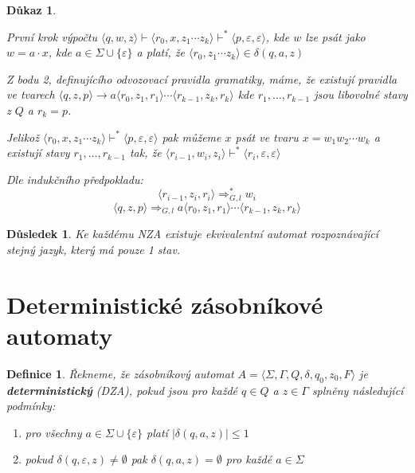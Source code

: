 \documentclass[10pt, a4paper, titlepage]{article}
\theoremstyle{note}
\newtheorem{definice}{Definice}
\newtheorem{dukaz}{Důkaz}
\newtheorem{dusledek}{Důsledek}
\begin{document}
\begin{dukaz}
\begin{itemize}
První krok výpočtu $\langle q,w,z \rangle \vdash \langle r_0,x,z_1 \cdots z_k \rangle \vdash^* \langle p,\varepsilon,\varepsilon \rangle$, kde $w$ lze psát jako $w=a\cdot x$, kde $a \in \Sigma \cup \lbrace \varepsilon \rbrace$ a platí, že $\langle r_0,z_1 \cdots z_k \rangle \in \delta (q,a,z)$

Z bodu 2, definujícího odvozovací pravidla gramatiky, máme, že existují pravidla ve tvarech $\langle q,z,p \rangle \rightarrow a \langle r_0,z_1,r_1 \rangle \cdots \langle r_{k-1},z_k,r_k \rangle$ kde $r_1,\ldots,r_{k-1}$ jsou libovolné stavy z $Q$ a $r_k=p$.

Jelikož $\langle r_0,x,z_1\cdots z_k \rangle \vdash^* \langle p,\varepsilon,\varepsilon \rangle$ pak můžeme $x$ psát ve tvaru $x=w_1w_2\cdots w_k$ a existují stavy $r_1,\ldots,r_{k-1}$ tak, že $\langle r_{i-1},w_i,z_i \rangle \vdash^* \langle r_i,\varepsilon,\varepsilon \rangle$

Dle indukčního předpokladu:
$$
\langle r_{i-1},z_i,r_i \rangle \Rightarrow_{G,l}^* w_i
$$$$
\langle q,z,p \rangle \Rightarrow_{G,l} a \langle r_0,z_1,r_1 \rangle \cdots \langle r_{k-1},z_k,r_k \rangle
$$
\end{itemize}
\end{dukaz}

\begin{dusledek}
Ke každému NZA existuje ekvivalentní automat rozpoznávající stejný jazyk, který má pouze 1 stav.
\end{dusledek}

\section{Deterministické zásobníkové automaty}

\begin{definice}
Řekneme, že zásobníkový automat $A = \langle \Sigma,\Gamma,Q,\delta,q_0,z_0,F \rangle$ je \textbf{deterministický} (DZA), pokud jsou pro každé $q \in Q$ a $z \in \Gamma$ splněny následující podmínky:
\begin{enumerate}
\item
pro všechny $a \in \Sigma \cup \lbrace \varepsilon \rbrace$ platí $|\delta (q,a,z)| \le 1$
\item
pokud $\delta (q,\varepsilon,z) \neq \emptyset$ pak $\delta (q,a,z) = \emptyset$ pro každé $a \in \Sigma$
\end{enumerate}
\end{definice}
\end{document}
